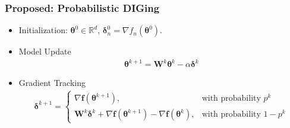 \documentclass[12pt,draftclsnofoot,onecolumn]{IEEEtran}
\begin{document}
\subsubsection{Proposed: Probabilistic DIGing}
\begin{itemize}
    \item Initialization: $\bm{\theta}^0 \in \mathbb{R}^d$, $\bm{\delta}_n^0 = \nabla f_n(\bm{\theta}^0)$.
    \item Model Update
    \begin{align}
    \bm{\theta}^{k+1} = \bm{W}^{k} \bm{\theta}^k - \alpha \bm{\delta}^k
    \end{align}
    \item Gradient Tracking
    \begin{align}
        \bm{\delta}^{k+1} =  \left\{\begin{array}{lr}
        \nabla \bm{f}(\bm{\theta}^{k+1}), &\text{with probability } p^k\\
         \bm{W}^{k} \bm{\delta}^{k} +  \nabla \bm{f}(\bm{\theta}^{k+1}) - \nabla \bm{f}(\bm{\theta}^{k}), &\text{with probability } 1-p^k
        \end{array}\right. 
    \end{align}
\end{itemize}
\end{document}
